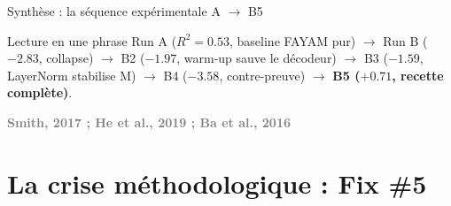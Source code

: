 \documentclass[10pt]{beamer}
\newcommand{\source}[1]{\vspace{4pt}\hfill{\textcolor{gray}{\textbf{\tiny #1}}}}
\begin{document}
\begin{frame}{Synthèse : la séquence expérimentale A $\to$ B5}

  \vspace{6pt}
  \begin{exampleblock}{Lecture en une phrase}
    \footnotesize
    Run A ($R^2{=}0.53$, baseline FAYAM pur) $\to$ Run B ($-2.83$, collapse) $\to$ B2 ($-1.97$, warm-up sauve le décodeur) $\to$ B3 ($-1.59$, LayerNorm stabilise M) $\to$ B4 ($-3.58$, contre-preuve) $\to$ \textbf{B5 ($+0.71$, recette complète)}.
  \end{exampleblock}

  \source{Smith, 2017 ; He et al., 2019 ; Ba et al., 2016}
\end{frame}


\section{La crise méthodologique : Fix \#5}
\end{document}
